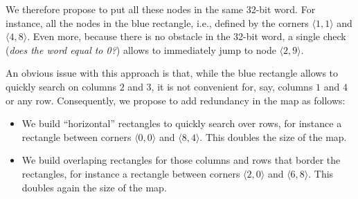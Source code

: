 We therefore propose to put all these nodes in the same 32-bit word.  
For instance, all the nodes in the blue rectangle, 
i.e., defined by the corners $\langle 1,1\rangle$ 
and $\langle 4,8\rangle$.  
Even more, because there is no obstacle in the 32-bit word, 
a single check (\emph{does the word equal to 0?}) 
allows to immediately jump to node $\langle 2,9\rangle$.  

An obvious issue with this approach 
is that, while the blue rectangle allows 
to quickly search on columns $2$ and $3$, 
it is not convenient for, say, columns $1$ and $4$ or any row.  
Consequently, we propose to add redundancy in the map as follows: 
\begin{itemize}
\item 
  We build ``horizontal'' rectangles 
  to quickly search over rows, 
  for instance a rectangle between corners 
  $\langle 0,0\rangle$ and $\langle 8,4\rangle$.  
  This doubles the size of the map.    
\item 
  We build overlaping rectangles 
  for those columns and rows that border the rectangles, 
  for instance a rectangle between corners 
  $\langle 2,0\rangle$ and $\langle 6,8\rangle$.  
  This doubles again the size of the map.  
\end{itemize}

